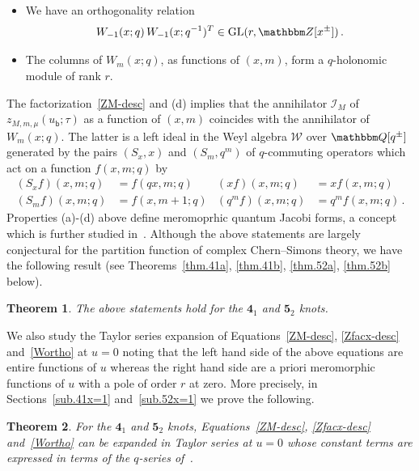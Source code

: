 \documentclass[12pt,reqno]{amsart}
\newtheorem{theorem}{Theorem}
\theoremstyle{definition}
\def\BZ{\mathbbm Z}
\def\BQ{\mathbbm Q}
\def\calI{\mathcal I}
\def\calI{\mathcal I}
\def\calW{\mathcal W}
\def\GL{\mathrm{GL}}
\def\ub{u_{\mathsf{b}}}
\def\md{\mathbf}
\newcommand{\knot}[1]{\md{#1}}
\begin{document}
\begin{itemize}
\item[(c)] We have an orthogonality relation
  \begin{equation}
    \label{Wortho}
    W_{-1}(x;q) \, W_{-1}(x;q^{-1})^T \in \GL(r,\BZ[x^\pm]) \,.
  \end{equation}
\item[(d)] The columns of $W_m(x;q)$, as functions of $(x,m)$, form a
  $q$-holonomic module of rank $r$.
\end{itemize}
The factorization~\eqref{ZM-desc} and (d) implies that the
annihilator $\calI_M$ of $z_{M,m,\mu}(\ub;\tau)$ as a function of
$(x,m)$ coincides with the annihilator of $W_m(x;q)$.  The latter is a
left ideal in the Weyl algebra $\calW$ over $\BQ[q^\pm]$ generated by
the pairs $(S_x,x)$ and $(S_m,q^m)$ of $q$-commuting operators which
act on a function $f(x,m;q)$ by
\begin{align}
  (S_x f)(x,m;q) &= f(qx,m;q) & (x f)(x,m;q) &= xf(x,m;q) \\
  (S_m f)(x,m;q) &= f(x,m+1;q) & (q^m f)(x,m;q) &= q^m f(x,m;q) \,.
\end{align}
Properties (a)-(d) above define meromoprhic quantum Jacobi forms, a
concept which is further studied in~\cite{GMZ}.  Although the above
statements are largely conjectural for the partition function of
complex Chern--Simons theory, we have the following result (see
Theorems~\ref{thm.41a}, \ref{thm.41b}, \ref{thm.52a}, \ref{thm.52b}
below).
  
\begin{theorem}
  \label{thm.4152W}
  The above statements hold for the $\knot{4}_1$ and $\knot{5}_2$
  knots.
\end{theorem}

We also study the Taylor series expansion of
Equations~\eqref{ZM-desc}, \eqref{Zfacx-desc} and~\eqref{Wortho} at
$u=0$ noting that the left hand side of the above equations are entire
functions of $u$ whereas the right hand side are a priori meromorphic
functions of $u$ with a pole of order $r$ at zero.  More precisely, in
Sections~\ref{sub.41x=1} and~\ref{sub.52x=1} we prove the following.
    
\begin{theorem}
  \label{thm.Zu=0}
  For the $\knot{4}_1$ and $\knot{5}_2$ knots,
  Equations~\eqref{ZM-desc}, \eqref{Zfacx-desc} and~\eqref{Wortho} can
  be expanded in Taylor series at $u=0$ whose constant terms are
  expressed in terms of the $q$-series of~\cite{GGM:resurgent}.
\end{theorem}
\end{document}
